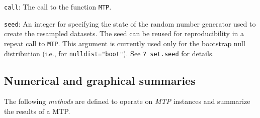 \documentclass[11pt]{article}
\newcommand{\Robject}[1]{\texttt{#1}}
\newcommand{\Rclass}[1]{\textit{#1}}
\begin{document}
\begin{description}
\item{\Robject{call}:} The call to the function \Robject{MTP}.

\item{\Robject{seed}:} 
An integer for specifying the state of the random number generator used to create the resampled datasets. 
The seed can be reused for reproducibility in a repeat call to \Robject{MTP}. 
This argument is currently used only for the bootstrap null distribution (i.e., for \texttt{nulldist="boot"}).
See \texttt{? set.seed} for details.


\end{description}

\subsection{Numerical and graphical summaries}
\label{anal:mult:s:summaries}

The following {\em methods} are defined to operate on \Rclass{MTP} instances and summarize the results of a MTP.
\end{document}
